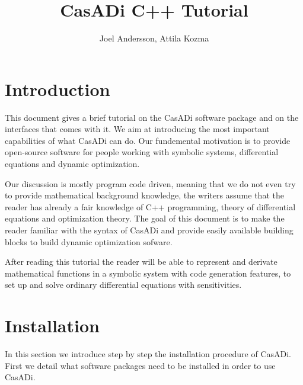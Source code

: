 \documentclass[a4paper,12pt]{book}
\author{Joel Andersson, Attila Kozma}
\title{CasADi C++ Tutorial }
\begin{document}
\maketitle
\begin{latexonly}
\tableofcontents
\end{latexonly}
\clearpage

\chapter{Introduction}
This document gives a brief tutorial on the CasADi software package and on the interfaces that comes with it. We aim at
introducing the most important capabilities of what CasADi can do. Our fundemental motivation is to provide open-source
software for people working with symbolic systems, differential equations and dynamic optimization.
\par Our discussion is mostly program code driven, meaning that
we do not even try to provide mathematical background knowledge, the writers assume that the reader has already a fair knowledge
of C++ programming, theory of differential equations and optimization theory. The goal of this document is to make the reader
 familiar with
the syntax of CasADi and provide easily available building blocks to build dynamic optimization sofware.
\par
After reading this tutorial the reader will be able to represent and derivate mathematical functions in a symbolic system with
code generation features, to
set up and solve ordinary differential equations with sensitivities.
\chapter{Installation}
In this section we introduce step by step the installation procedure of CasADi. First we detail what software packages need to
be installed in order to use CasADi.
\end{document}
